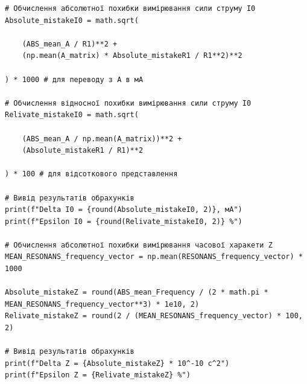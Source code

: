 \documentclass[12pt,a4paper]{article}
\begin{document}
{\begin{verbatim}
# Обчислення абсолютної похибки вимірювання сили струму I0
Absolute_mistakeI0 = math.sqrt(

    (ABS_mean_A / R1)**2 +
    (np.mean(A_matrix) * Absolute_mistakeR1 / R1**2)**2

) * 1000 # для переводу з А в мА

# Обчислення відносної похибки вимірювання сили струму I0
Relivate_mistakeI0 = math.sqrt(

    (ABS_mean_A / np.mean(A_matrix))**2 +
    (Absolute_mistakeR1 / R1)**2

) * 100 # для відсоткового представлення

# Вивід результатів обрахунків
print(f"Delta I0 = {round(Absolute_mistakeI0, 2)}, мА")
print(f"Epsilon I0 = {round(Relivate_mistakeI0, 2)} %")

# Обчислення абсолютної похибки вимірювання часової харакети Z
MEAN_RESONANS_frequency_vector = np.mean(RESONANS_frequency_vector) * 1000

Absolute_mistakeZ = round(ABS_mean_Frequency / (2 * math.pi *
MEAN_RESONANS_frequency_vector**3) * 1e10, 2)
Relivate_mistakeZ = round(2 / (MEAN_RESONANS_frequency_vector) * 100, 2)

# Вивід результатів обрахунків
print(f"Delta Z = {Absolute_mistakeZ} * 10^-10 с^2")
print(f"Epsilon Z = {Relivate_mistakeZ} %")
    \end{verbatim}
    }
\end{document}
